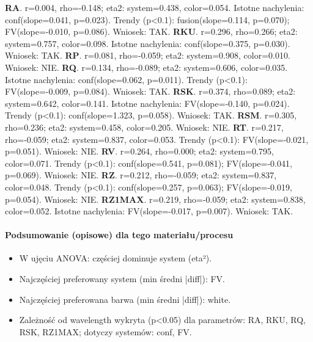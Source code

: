 \documentclass[
  10pt,
]{article}
\begin{document}
\textbf{RA}. r=0.004, rho=-0.148; eta2: system=0.438, color=0.054.
Istotne nachylenia: conf(slope=0.041, p=0.023). Trendy (p\textless0.1):
fusion(slope=0.114, p=0.070); FV(slope=-0.010, p=0.086). Wniosek: TAK.
\textbf{RKU}. r=0.296, rho=0.266; eta2: system=0.757, color=0.098.
Istotne nachylenia: conf(slope=0.375, p=0.030). Wniosek: TAK.
\textbf{RP}. r=0.081, rho=-0.059; eta2: system=0.908, color=0.010.
Wniosek: NIE. \textbf{RQ}. r=0.134, rho=-0.089; eta2: system=0.606,
color=0.035. Istotne nachylenia: conf(slope=0.062, p=0.011). Trendy
(p\textless0.1): FV(slope=-0.009, p=0.084). Wniosek: TAK. \textbf{RSK}.
r=0.374, rho=0.089; eta2: system=0.642, color=0.141. Istotne nachylenia:
FV(slope=-0.140, p=0.024). Trendy (p\textless0.1): conf(slope=1.323,
p=0.058). Wniosek: TAK. \textbf{RSM}. r=0.305, rho=0.236; eta2:
system=0.458, color=0.205. Wniosek: NIE. \textbf{RT}. r=0.217,
rho=-0.059; eta2: system=0.837, color=0.053. Trendy (p\textless0.1):
FV(slope=-0.021, p=0.051). Wniosek: NIE. \textbf{RV}. r=0.264,
rho=0.000; eta2: system=0.795, color=0.071. Trendy (p\textless0.1):
conf(slope=0.541, p=0.081); FV(slope=-0.041, p=0.069). Wniosek: NIE.
\textbf{RZ}. r=0.212, rho=-0.059; eta2: system=0.837, color=0.048.
Trendy (p\textless0.1): conf(slope=0.257, p=0.063); FV(slope=-0.019,
p=0.054). Wniosek: NIE. \textbf{RZ1MAX}. r=0.219, rho=-0.059; eta2:
system=0.838, color=0.052. Istotne nachylenia: FV(slope=-0.017,
p=0.007). Wniosek: TAK.

\paragraph{Podsumowanie (opisowe) dla tego materiału/procesu}
\begin{itemize}
\item W ujęciu ANOVA: częściej dominuje system (eta²).
\item Najczęściej preferowany system (min średni |diff|): FV.
\item Najczęściej preferowana barwa (min średni |diff|): white.
\item Zależność od wavelength wykryta (p<0.05) dla parametrów: RA, RKU, RQ, RSK, RZ1MAX; dotyczy systemów: conf, FV.
\end{itemize}
\end{document}
